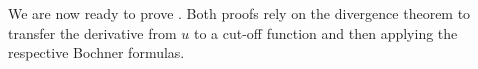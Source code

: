 \documentclass{amsart}
\theoremstyle{plain}
\theoremstyle{plain}
\theoremstyle{plain}
\theoremstyle{plain}
\theoremstyle{remark}
\begin{document}
    We are now ready to prove .
    Both proofs rely on the divergence theorem to transfer the derivative from $u$ to a cut-off function and then applying the respective Bochner formulas.


\end{document}

